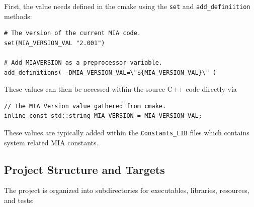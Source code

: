 First, the value needs defined in the cmake using the \texttt{set} and \texttt{add\_definiition} methods:
\begin{lstlisting}[style=shellstyle]
# The version of the current MIA code.
set(MIA_VERSION_VAL "2.001")

# Add MIAVERSION as a preprocessor variable.
add_definitions( -DMIA_VERSION_VAL=\"${MIA_VERSION_VAL}\" )
\end{lstlisting}
These values can then be accessed within the source C++ code directly via
\begin{lstlisting}[style=cppstyle]
// The MIA Version value gathered from cmake.
inline const std::string MIA_VERSION = MIA_VERSION_VAL;
\end{lstlisting}
These values are typically added within the \texttt{Constants\_LIB} files which contains system related MIA constants. 

\subsection{Project Structure and Targets}

The project is organized into subdirectories for executables, libraries, resources, and tests:


